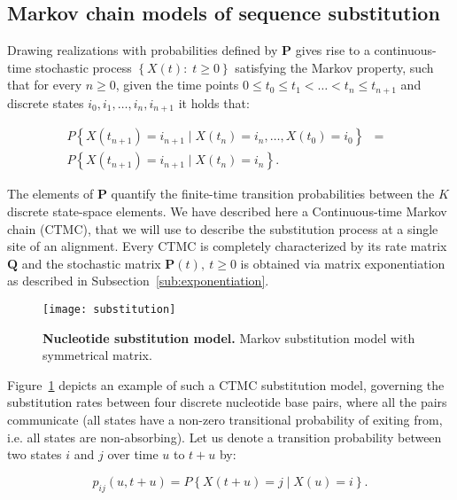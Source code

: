 \subsection{Markov chain models of sequence substitution\label{sub:subst_models}}

Drawing realizations with probabilities defined by $\mathbf{P}$  gives rise to a continuous-time stochastic process $\left\{ X(t):\; t\geq0\right\}$ satisfying the Markov property, such that for every $n\geq 0$, given the time points $0\leq t_{0}\leq t_{1}<\ldots<t_{n}\leq t_{n+1}$ and discrete states $i_{0},i_{1}, \ldots, i_{n},i_{n+1}$ it holds that: 

\begin{eqnarray}
P\left\{ X(t_{n+1})=i_{n+1}\mid X(t_{n})=i_{n},\ldots, X(t_{0})=i_{0}\right\} & = & \\ \nonumber
P\left\{ X(t_{n+1})=i_{n+1}\mid X(t_{n})=i_{n}\right\} .
\label{eq:markov}
\end{eqnarray}

The elements of $\mathbf{P}$ quantify the finite-time transition probabilities between the $K$ discrete state-space elements.
We have described here a Continuous-time Markov chain (CTMC), that we will use to describe the substitution process at a single site of an alignment.
Every CTMC is completely characterized by its rate matrix $\mathbf{Q}$ and the stochastic matrix $\mathbf{P}(t),\ t\geq0$ is obtained via matrix exponentiation as described in Subsection~\ref{sub:exponentiation}.

\begin{figure}[H]
\centering
\texttt{[image: substitution]} 
\caption{
{ \footnotesize 
{\bf  Nucleotide substitution model.} Markov substitution model with symmetrical matrix.
} %
}
\label{fig:substitution}
\end{figure}

Figure~\ref{fig:substitution} depicts an example of such a CTMC substitution model, governing the substitution rates between four discrete nucleotide base pairs, where all the pairs communicate (all states have a non-zero transitional probability of exiting from, i.e. all states are non-absorbing).
Let us denote a transition probability between two states $i$ and $j$ over time $u$ to $t+u$ by:

\begin{equation}
p_{ij}\left(u,t+u\right)=P\left\{ X(t+u)=j\mid X(u)=i\right\} .
\end{equation}


